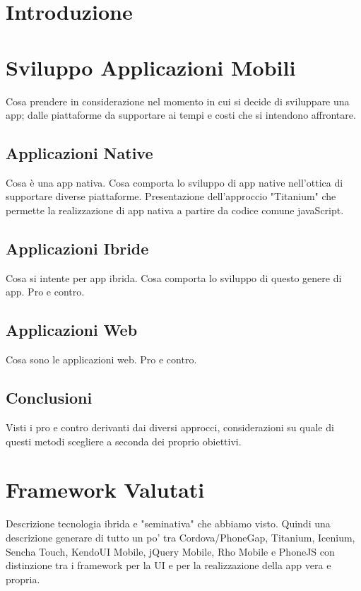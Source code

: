 \chapter{Introduzione}

\chapter{Sviluppo Applicazioni Mobili}
	Cosa prendere in considerazione nel momento in cui si decide di sviluppare
	una app; dalle piattaforme da supportare ai tempi e costi che si intendono
	affrontare.
	
	\section{Applicazioni Native}
		Cosa è una app nativa. Cosa comporta lo sviluppo di app native nell'ottica
		di supportare diverse piattaforme. Presentazione dell'approccio "Titanium" che
		permette la realizzazione di app nativa a partire da codice comune javaScript.
		
	\section{Applicazioni Ibride}
		Cosa si intente per app ibrida. Cosa comporta lo sviluppo di questo genere
		di app. Pro e contro.
		
	\section{Applicazioni Web}
		Cosa sono le applicazioni web. Pro e contro.
		
	\section{Conclusioni}
		Visti i pro e contro derivanti dai diversi approcci, considerazioni su
		quale di questi metodi scegliere a seconda dei proprio obiettivi.
		
		
\chapter{Framework Valutati}
	Descrizione tecnologia ibrida e "seminativa" che abbiamo visto.
	Quindi una descrizione generare di tutto un po' tra Cordova/PhoneGap, Titanium,
	Icenium, Sencha Touch, KendoUI Mobile, jQuery Mobile, Rho Mobile e PhoneJS
	con distinzione tra i framework per la UI e per la realizzazione della app vera
	e propria.
	
